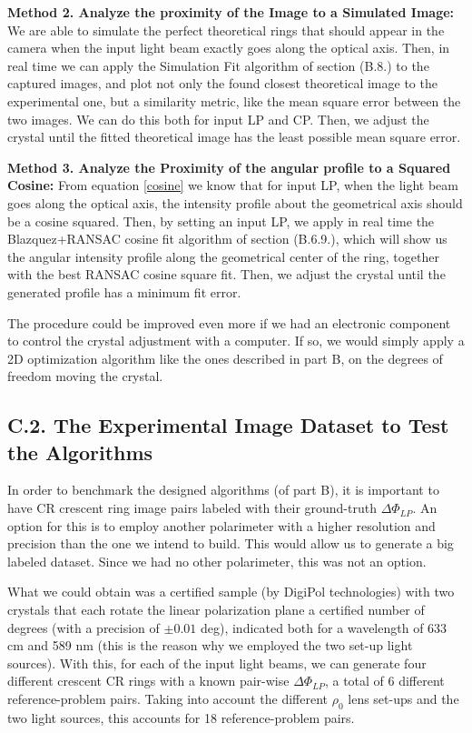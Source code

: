 \documentclass[11pt, a4paper, twoside]{article} %
\begin{document}
{\bf Method 2. Analyze the proximity of the Image to a Simulated Image:} We are able to simulate the perfect theoretical rings that should appear in the camera when the input light beam exactly goes along the optical axis. Then, in real time we can apply the Simulation Fit algorithm of section (B.8.) to the captured images, and plot not only the found closest theoretical image to the experimental one, but a similarity metric, like the mean square error between the two images. We can do this both for input LP and CP. Then, we adjust the crystal until the fitted theoretical image has the least possible mean square error.

{\bf Method 3. Analyze the Proximity of the angular profile to a Squared Cosine:} From equation \eqref{cosine} we know that for input LP, when the light beam goes along the optical axis, the intensity profile about the geometrical axis should be a cosine squared. Then, by setting an input LP, we apply in real time the Blazquez+RANSAC cosine fit algorithm of section (B.6.9.), which will show us the angular intensity profile along the geometrical center of the ring, together with the best RANSAC cosine square fit. Then, we adjust the crystal until the generated profile has a minimum fit error.

The procedure could be improved even more if we had an electronic component to control the crystal adjustment with a computer. If so, we would simply apply a 2D optimization algorithm like the ones described in part B, on the degrees of freedom moving the crystal.


\subsection*{C.2. The Experimental Image Dataset to Test the Algorithms}
In order to benchmark the designed algorithms (of part B), it is important to have CR crescent ring image pairs labeled with their ground-truth $\Delta \Phi_{LP}$. An option for this is to employ another polarimeter with a higher resolution and precision than the one we intend to build. This would allow us to generate a big labeled dataset. Since we had no other polarimeter, this was not an option.

What we could obtain was a certified sample (by DigiPol technologies) with two crystals that each rotate the linear polarization plane a certified number of degrees (with a precision of $\pm 0.01$ deg), indicated both for a wavelength of 633 cm and 589 nm (this is the reason why we employed the two set-up light sources). With this, for each of the input light beams, we can generate four different crescent CR rings with a known pair-wise $\Delta \Phi_{LP}$, a total of 6 different reference-problem pairs. Taking into account the different $\rho_0$ lens set-ups and the two light sources, this accounts for 18 reference-problem pairs.
\end{document}
